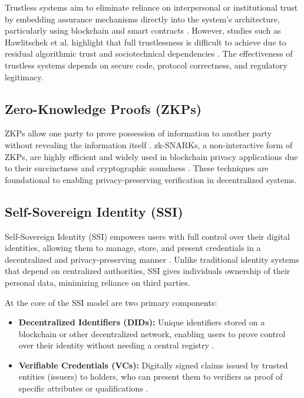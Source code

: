 \documentclass[conference]{IEEEtran}
\begin{document}
Trustless systems aim to eliminate reliance on interpersonal or institutional trust by embedding assurance mechanisms directly into the system’s architecture, particularly using blockchain and smart contracts \cite{gan2024}. However, studies such as Hawlitschek et al. highlight that full trustlessness is difficult to achieve due to residual algorithmic trust and sociotechnical dependencies \cite{hawlitschek2018}. The effectiveness of trustless systems depends on secure code, protocol correctness, and regulatory legitimacy.

\subsection{Zero-Knowledge Proofs (ZKPs)}
ZKPs allow one party to prove possession of information to another party without revealing the information itself \cite{dieye2023}. zk-SNARKs, a non-interactive form of ZKPs, are highly efficient and widely used in blockchain privacy applications due to their succinctness and cryptographic soundness \cite{chen2022, moya2023}. These techniques are foundational to enabling privacy-preserving verification in decentralized systems.

\subsection{Self-Sovereign Identity (SSI)}
Self-Sovereign Identity (SSI) empowers users with full control over their digital identities, allowing them to manage, store, and present credentials in a decentralized and privacy-preserving manner \cite{raipurkar2023}. Unlike traditional identity systems that depend on centralized authorities, SSI gives individuals ownership of their personal data, minimizing reliance on third parties.

At the core of the SSI model are two primary components:

\begin{itemize}
  \item \textbf{Decentralized Identifiers (DIDs):} Unique identifiers stored on a blockchain or other decentralized network, enabling users to prove control over their identity without needing a central registry \cite{reed2020}.
  \item \textbf{Verifiable Credentials (VCs):} Digitally signed claims issued by trusted entities (issuers) to holders, who can present them to verifiers as proof of specific attributes or qualifications \cite{sporny2022}.
\end{itemize}
\end{document}
